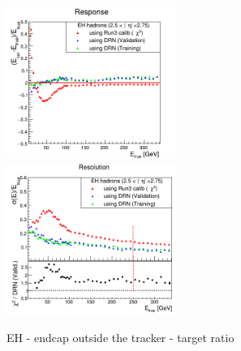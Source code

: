 \begin{figure}
\includegraphics[width=0.495\textwidth]{./plots_pdf/HCAL_plots/Trained_target_ratioflip_0_500_10/pdf/EH_ec_out/EC_outside_tracker_corrEtaEndcapEcalHcal.png}
\includegraphics[width=0.495\textwidth]{./plots_pdf/HCAL_plots/Trained_target_ratioflip_0_500_10/pdf/EH_ec_out/EC_outside_tracker_corrEtaEndcapEcalHcal_reso.png}
\caption{EH - endcap outside the tracker - target ratio}
\end{figure}
